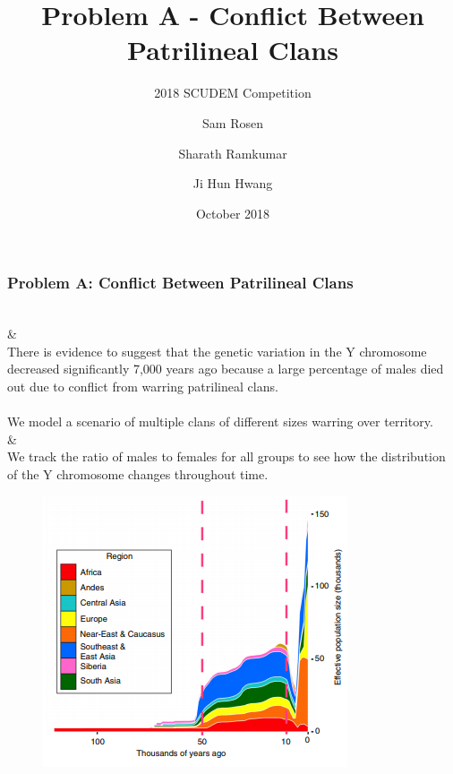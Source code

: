 \documentclass[t]{beamer}
\begin{document}
\title{Problem A - Conflict Between Patrilineal Clans}
\subtitle{2018 SCUDEM Competition}
\author{Sam Rosen \and Sharath Ramkumar \and Ji Hun Hwang}
\date{October 2018}

\begin{frame}
\titlepage

\end{frame}

\begin{frame}
\frametitle{Problem A: Conflict Between Patrilineal Clans}
\\
&
\\
There is evidence to suggest that the genetic variation in the Y chromosome decreased significantly 7,000 years ago because a large percentage of males died out due to conflict from warring patrilineal clans. \\~\\
We model a scenario of multiple clans of different sizes warring over territory.
\\
&
\\
We track the ratio of males to females for all groups to see how the distribution of the Y chromosome changes throughout time.

\vspace{2cm}
\begin{center}
\begin{figure}
\vspace{-2.1cm}
\includegraphics[scale=0.4]{malepop.png} %
\end{figure}
\end{center}

\end{frame}
\end{document}
